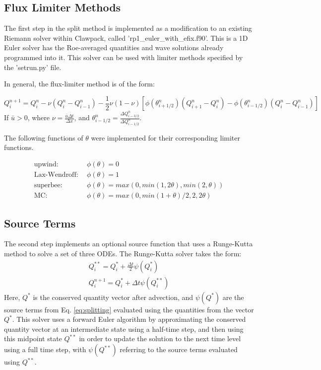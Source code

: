 \documentclass[11pt]{article}%
\numberwithin{equation}{section}
\begin{document}
\subsection{Flux Limiter Methods}
The first step in the split method is implemented as a modification to an existing Riemann solver within Clawpack, called 'rp1\_euler\_with\_efix.f90'. This is a 1D Euler solver has the Roe-averaged quantities and wave solutions already programmed into it. This solver can be used with limiter methods specified by the 'setrun.py' file.

In general, the flux-limiter method is of the form:

\begin{equation}
Q^{n+1}_i=Q^n_i-\nu(Q^n_i-Q^n_{i-1})-\frac{1}{2}\nu(1-\nu)[\phi(\theta^n_{i+1/2})(Q^n_{i+1}-Q^n_i)-\phi(\theta^n_{i-1/2})(Q^n_{i}-Q^n_{i-1})]
\end{equation}
If $ \bar{u} > 0 $, where $ \nu=\frac{\bar{u}\Delta t}{\Delta x} $, and $ \theta^n_{i-1/2}=\frac{\Delta Q^n_{i-3/2}}{\Delta Q^n_{i-1/2}} $.

The following functions of $ \theta $ were implemented for their corresponding limiter functions.

\begin{align}
\text{upwind:} \ \ & \phi(\theta)=0 \\
\text{Lax-Wendroff:} \ \ & \phi(\theta)=1 \\
\text{superbee:} \ \ & \phi(\theta)=max(0,min(1,2\theta), min(2,\theta)) \\
\text{MC:} \ \ & \phi(\theta)=max(0,min(1+\theta)/2,2, 2\theta)
\end{align}

\subsection{Source Terms}
The second step implements an optional source function that uses a Runge-Kutta method to solve a set of three ODEs. The Runge-Kutta solver takes the form:
\begin{equation}
\begin{split}
Q^{**}_i=Q^*_i+\frac{\Delta t}{2} \psi (Q^*_i) \\
Q^{n+1}_i=Q^*_i+ \Delta t \psi(Q^{**}_i)
\end{split}
\end{equation}
Here, $ Q^* $ is the conserved quantity vector after advection, and $ \psi(Q^*) $ are the source terms from Eq. \ref{eq:splitting} evaluated using the quantities from the vector $ Q^* $. This solver uses a forward Euler algorithm by approximating the conserved quantity vector at an intermediate state using a half-time step, and then using this midpoint state $ Q^{**} $ in order to update the solution to the next time level using a full time step, with $ \psi(Q^{**}) $ referring to the source terms evaluated using $ Q^{**} $.
\end{document}
